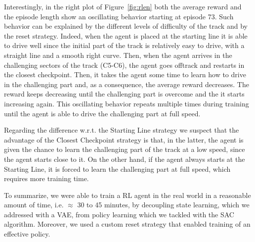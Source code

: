 Interestingly, in the right plot of Figure~\ref{fig:rlen} both the average reward and the episode length show an oscillating behavior starting at episode 73. Such behavior can be explained by the different levels of difficulty of the track and by the reset strategy. Indeed, when the agent is placed at the starting line it is able to drive well since the initial part of the track is relatively easy to drive, with a straight line and a smooth right curve. Then, when the agent arrives in the challenging sectors of the track (C5-C6), the agent goes offtrack and restarts in the closest checkpoint. Then, it takes the agent some time to learn how to drive in the challenging part and, as a consequence, the average reward decreases. The reward keeps decreasing until the challenging part is overcome and the it starts increasing again. This oscillating behavior repeats multiple times during training until the agent is able to drive the challenging part at full speed.

Regarding the difference w.r.t. the Starting Line strategy we suspect that the advantage of the Closest Checkpoint strategy is that, in the latter, the agent is given the chance to learn the challenging part of the track at a low speed, since the agent starts close to it. On the other hand, if the agent always starts at the Starting Line, it is forced to learn the challenging part at full speed, which requires more training time.

To summarize, we were able to train a RL agent in the real world in a reasonable amount of time, i.e. $\approx$ 30 to 45 minutes, by decoupling state learning, which we addressed with a VAE, from policy learning which we tackled with the SAC algorithm. Moreover, we used a custom reset strategy that enabled training of an effective policy.

